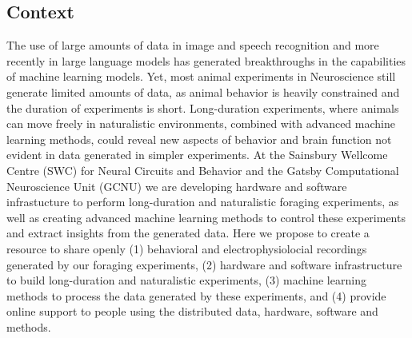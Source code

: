 \subsection{Context}

The use of large amounts of data in image and speech recognition and more
recently in large language models has generated breakthroughs in the
capabilities of machine learning models. Yet, most animal experiments in
Neuroscience still generate limited amounts of data, as animal behavior is
heavily constrained and the duration of experiments is short.
%
Long-duration experiments, where animals can move freely in naturalistic
environments, combined with advanced machine learning methods, could reveal new
aspects of behavior and brain function not evident in data generated in simpler
experiments.
%
At the Sainsbury Wellcome Centre (SWC) for Neural Circuits and Behavior and the
Gatsby Computational Neuroscience Unit (GCNU) we are developing hardware and
software infrastucture to perform long-duration and naturalistic foraging
experiments, as well as creating advanced machine learning methods to control
these experiments and extract insights from the generated data.
%
Here we propose to create a resource to share openly (1) behavioral and
electrophysiolocial recordings generated by our foraging experiments, (2)
hardware and software infrastructure to build long-duration and naturalistic
experiments, (3) machine learning methods to process the data generated by
these experiments, and (4) provide online support to people using the
distributed data, hardware, software and methods.

%
% 
%

%

